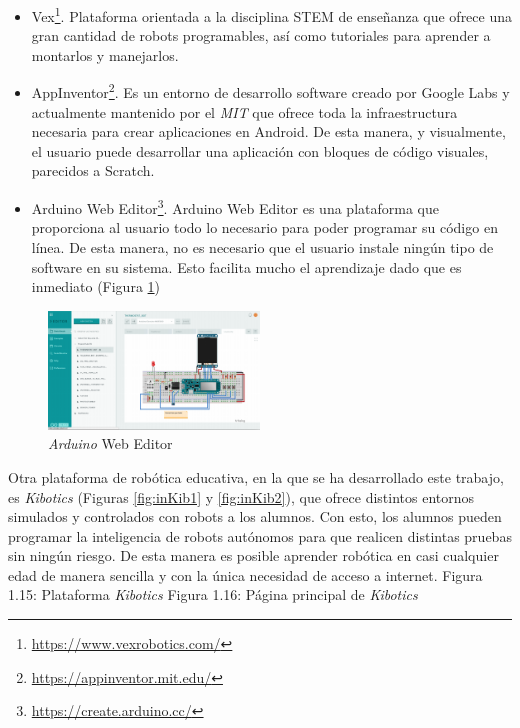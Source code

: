\begin{itemize}
  \item Vex\footnote{\url{https://www.vexrobotics.com/}}. Plataforma orientada a la disciplina STEM de enseñanza que ofrece una gran cantidad de robots programables, así como tutoriales para aprender a montarlos y manejarlos. 
  \item AppInventor\footnote{\url{https://appinventor.mit.edu/}}. Es un entorno de desarrollo software creado por Google Labs y actualmente mantenido por el \textit{MIT} que ofrece toda la infraestructura necesaria para crear aplicaciones en Android. De esta manera, y visualmente, el usuario puede desarrollar una aplicación con bloques de código visuales, parecidos a Scratch.
  \item Arduino Web Editor\footnote{\url{https://create.arduino.cc/}}. Arduino Web Editor es una plataforma que proporciona al usuario todo lo necesario para poder programar su código en línea. De esta manera, no es necesario que el usuario instale ningún tipo de software en su sistema. Esto facilita mucho el aprendizaje dado que es inmediato (Figura \ref{fig.arduino})
  
\end{itemize}
 \begin{figure}[H]
  \begin{center}
    \includegraphics[width=0.5\textwidth]{figures/introduccion/arduino.png}
		\caption{\textit{Arduino} Web Editor}
		\label{fig.arduino}
		\end{center}
\end{figure}
Otra plataforma de robótica educativa, en la que se ha desarrollado este trabajo, es \textit{Kibotics} (Figuras \ref{fig:inKib1} y \ref{fig:inKib2}), que ofrece distintos entornos simulados y controlados con robots a los alumnos. Con esto, los alumnos pueden programar la inteligencia de robots autónomos para que realicen distintas pruebas sin ningún riesgo. De esta manera es posible aprender robótica en casi cualquier edad de manera sencilla y con la única necesidad de acceso a internet. Figura 1.15: Plataforma \textit{Kibotics} Figura 1.16: Página principal de \textit{Kibotics} 
